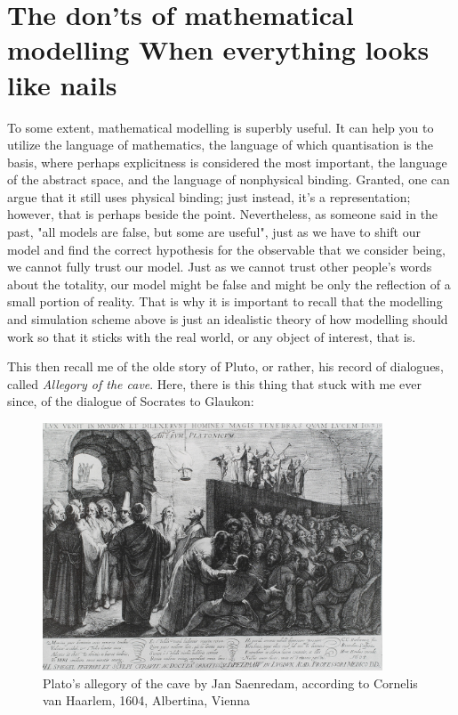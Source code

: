 \section[The don'ts of mathematical modelling]{The don'ts of mathematical modelling {\small When everything looks like nails}}
To some extent, mathematical modelling is superbly useful. It can help you to utilize the language of mathematics, the language of which quantisation is the basis, where perhaps explicitness is considered the most important, the language of the abstract space, and the language of nonphysical binding. Granted, one can argue that it still uses physical binding; just instead, it's a representation; however, that is perhaps beside the point. Nevertheless, as someone said in the past, "all models are false, but some are useful", just as we have to shift our model and find the correct hypothesis for the observable that we consider being, we cannot fully trust our model. Just as we cannot trust other people's words about the totality, our model might be false and might be only the reflection of a small portion of reality. That is why it is important to recall that the modelling and simulation scheme above is just an idealistic theory of how modelling should work so that it sticks with the real world, or any object of interest, that is. 

This then recall me of the olde story of Pluto, or rather, his record of dialogues, called \textit{Allegory of the cave}. Here, there is this thing that stuck with me ever since, of the dialogue of Socrates to Glaukon:

\begin{figure}[h!]
    \centering
    \includegraphics[width=0.9\textwidth]{img/Platon_Cave_Sanraedam_1604.jpg}
    \caption{Plato's allegory of the cave by Jan Saenredam, according to Cornelis van Haarlem, 1604, Albertina, Vienna}
    \label{fig:PlatoAllegory}
\end{figure}

